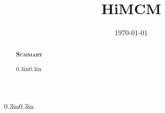 \documentclass{mcmthesis}
\title{HiMCM}
\date{\today}
\begin{document}
\begin{abstract}

\begin{center}
{\large\scshape\bfseries Summary}
\end{center}
\begin{changemargin}{0.3in}{0.3in} 

\end{changemargin} 
\end{abstract}

\maketitle
\newpage



\begin{changemargin}{0.3in}{0.3in}
{%
\tableofcontents
}
\end{changemargin}

\setlength{\parskip}{0.05em}

\newpage




















% 

% 

% 







\newpage


\newpage


{\scriptsize

}

% 
\end{document}
